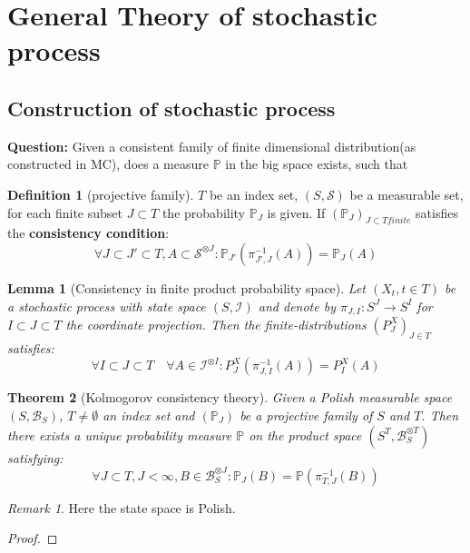 \documentclass[a4paper,11pt]{book}
\newtheorem{theorem}{Theorem}[section]
\newtheorem{lemma}[theorem]{Lemma}
\theoremstyle{definition}
\newtheorem{definition}{Definition}[section]
\theoremstyle{remark}
\newtheorem*{remark}{Remark}
\begin{document}
\newpage
\section{General Theory of stochastic process}

\subsection{Construction of stochastic process}

\textbf{Question:} Given a consistent family of finite dimensional distribution(as constructed in MC), does a measure $\mathbb{P}$ in the big space exists, such that
\begin{definition}[projective family]
$T$ be an index set, $(S, \mathcal{S})$ be a measurable set, for each finite subset $J \subset T$ the probability $\mathbb{P}_J$ is given. If $(\mathbb{P}_J)_{J \subset T finite}$ satisfies the \textbf{consistency condition}:
\begin{equation*}
	\forall J \subset J' \subset T, A \subset \mathcal{S}^{\otimes J}: \mathbb{P}_{J'}(\pi_{J', J}^{-1}(A)) = \mathbb{P}_J(A)
\end{equation*}
\end{definition}

\begin{lemma}[Consistency in finite product probability space]
	Let $(X_t, t \in T)$ be a stochastic process with state space $(S, \mathcal{I})$ and denote by $\pi_{J, I}: S^J \rightarrow S^I$ for $I \subset J \subset T$ the coordinate projection. Then the finite-distributions $(P_J^X)_{J\in T}$ satisfies:
	\begin{equation*}
		\forall I \subset J \subset T \quad \forall A \in \mathcal{I}^{\otimes I}: P^X_J(\pi_{J, I}^{-1}(A)) = P_I^X(A)
	\end{equation*}
\end{lemma}



\begin{theorem}[Kolmogorov consistency theory]
	Given a Polish measurable space $(S, \mathcal{B}_S)$, $T \neq \emptyset$ an index set and $(\mathbb{P}_J)$ be a projective family of $S$ and $T$. Then there exists a unique probability measure $\mathbb{P}$ on the product space $(S^T, \mathcal{B}^{\otimes T}_S)$ satisfying:
	\begin{equation*}
		\forall J \subset T, J < \infty, B \in \mathcal{B}^{\otimes J}_S: \mathbb{P}_J(B) = \mathbb{P}(\pi_{T, J}^{-1}(B))
	\end{equation*}
\end{theorem}
\begin{remark}
	Here the state space is Polish.
\end{remark}
\begin{proof}
\end{proof}
\end{document}
